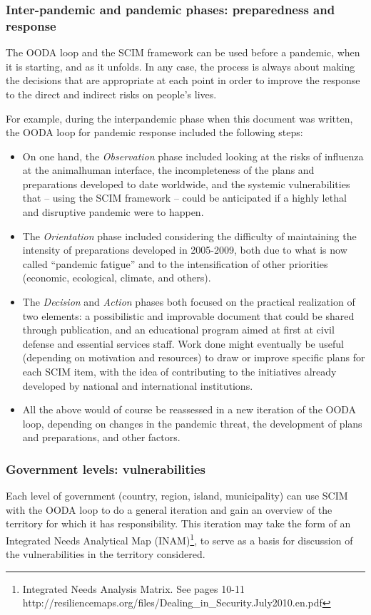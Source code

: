 \documentclass[12pt, a4]{scrartcl}
\begin{document}
\subsubsection{Inter-pandemic and pandemic phases: preparedness and response}
The OODA loop and the SCIM framework can be used before a pandemic, when it is starting, and as it unfolds. In any case, the process is always about making the decisions that are appropriate at each point in order to improve the response to the direct and indirect risks on people's lives.

For example, during the interpandemic phase when this document was written, the OODA loop for pandemic response included the following steps:

\begin{itemize}
	\item On one hand, the \emph{Observation} phase included looking at the risks of influenza at the animalhuman interface, the incompleteness of the plans and preparations developed to date worldwide, and the systemic vulnerabilities that – using the SCIM framework – could be anticipated if a highly lethal and disruptive pandemic were to happen.
	\item The \emph{Orientation} phase included considering the difficulty of maintaining the intensity of preparations developed in 2005-2009, both due to what is now called “pandemic fatigue” and to the intensification of other priorities (economic, ecological, climate, and others).
	\item The \emph{Decision} and \emph{Action} phases both focused on the practical realization of two elements: a possibilistic and improvable document that could be shared through publication, and an educational program aimed at first at civil defense and essential services staff. Work done might eventually be useful (depending on motivation and resources) to draw or improve specific plans for each SCIM item, with the idea of contributing to the initiatives already developed by national and international institutions.
	\item All the above would of course be reassessed in a new iteration of the OODA loop, depending on changes in the pandemic threat, the development of plans and preparations, and other factors.
\end{itemize}

\subsubsection{Government levels: vulnerabilities}
Each level of government (country, region, island, municipality) can use SCIM with the OODA loop to do a general iteration and gain an overview of the territory for which it has responsibility. This iteration may take the form of an Integrated Needs Analytical Map (INAM)\footnote{Integrated Needs Analysis Matrix. See pages 10-11 http://resiliencemaps.org/files/Dealing_in_Security.July2010.en.pdf}, to serve as a basis for discussion of the vulnerabilities in the territory considered.
\end{document}
